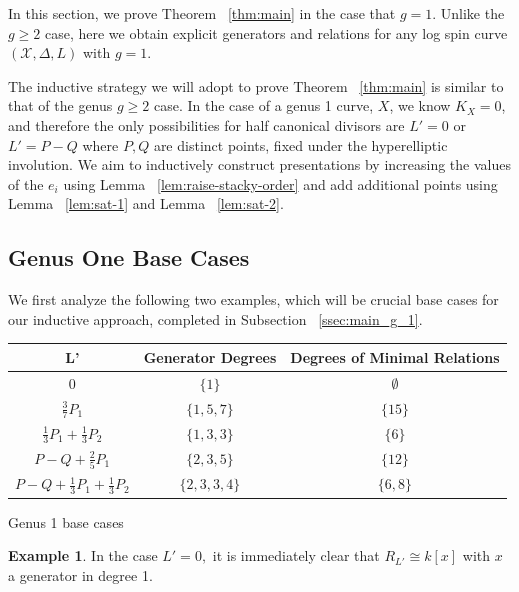 \documentclass{amsart}
\theoremstyle{plain}
\theoremstyle{definition}
\newtheorem{example}[thm]{Example}
\theoremstyle{remark}
\numberwithin{equation}{section}
\newcommand\ssec{\subsection}
\newcommand \sx{\mathscr X}
\newcommand \halfcan{L}
\begin{document}
In this section, we prove Theorem ~\ref{thm:main} in the case that $g = 1$. Unlike the $g \geq 2$ case, here we obtain explicit generators and relations for any log spin curve $(\sx, \Delta, L)$ with $g = 1$.

The inductive strategy we will adopt to prove Theorem ~\ref{thm:main} is similar to that of the genus $g \geq 2$ case. In the case of a genus 1 curve, $X$, we know $K_X = 0$, and therefore the only possibilities for half canonical divisors are $\halfcan' = 0$ or $\halfcan' = P - Q$ where $P,Q$ are distinct points, fixed  under the hyperelliptic involution. We aim to inductively construct presentations by increasing the values of the $e_i$ using Lemma ~\ref{lem:raise-stacky-order} and add additional points using Lemma ~\ref{lem:sat-1} and Lemma ~\ref{lem:sat-2}.

\ssec{Genus One Base Cases}
\label{ssec:g_1_base}

We first analyze the following two examples, which will be crucial base cases for our inductive approach, completed in Subsection ~\ref{ssec:main_g_1}.

\begin{longtable}	{| c || c | c |}
	\hline
	L' & Generator Degrees & Degrees of Minimal Relations \\
	\hline
	\hline
	$0$ & $\{1\}$ & $\emptyset$ \\	\hline

	$\frac{3}{7}P_1$ & $\{1,5,7\}$ & $\{15\}$ \\	\hline
	
	$\frac{1}{3}P_1 + \frac{1}{3}P_2$ & $\{1, 3, 3\}$ & $\{6\}$ \\	\hline
	
	$P - Q + \frac{2}{5}P_1$ & $\{2,3,5\}$ & $\{12\}$ \\	\hline
	
	$P - Q + \frac{1}{3}P_1 + \frac{1}{3}P_2$ & $\{2, 3, 3, 4\}$ & $\{6,8\}$ \\	\hline
	
\end{longtable}

\begin{center}
\label{table:g-1-base}
Genus 1 base cases
\end{center}

\begin{example}
\label{eg:base-1-0}
In the case $\halfcan' = 0,$ it is immediately clear that $R_{\halfcan'} \cong k[x]$ with $x$ a generator in degree 1.
\end{example}
\end{document}
